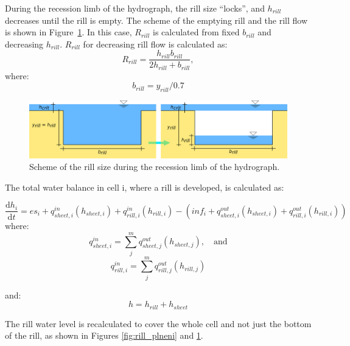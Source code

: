 During the recession limb of the hydrograph, the rill size “locks”, and
$h_{rill}$ decreases until the rill is empty. The scheme of the emptying rill
and the rill flow is shown in Figure~\ref{fig:rill_prazdneni}. In this case,
$R_{rill}$ is calculated from fixed $b_{rill}$ and decreasing $h_{rill}$.
$R_{rill}$ for decreasing rill flow is calculated as:
\begin{equation}
    R_{rill} = \frac{h_{rill}b_{rill}}{2h_{rill}+b_{rill}},
  \label{eq:rrill2}
\end{equation}
where:
\begin{equation}
  b_{rill} = y_{rill}/0.7
  \label{eq:brill2}
\end{equation}

\begin{figure}[t]
    \includegraphics[width=1\linewidth]{./img/rill_schema_prazdneni.png}
    \caption{Scheme of the rill size during the recession limb of the hydrograph.}
    \label{fig:rill_prazdneni}
\end{figure}

The total water balance in cell i, where a rill is developed, is calculated as:

\begin{equation}
    \frac{\mathrm{d}h_i}{\mathrm{d}t} = es_i + q^{in}_{sheet,i}(h_{sheet,i})
    +q^{in}_{rill,i}(h_{rill,i}) - (inf_i + q^{out}_{sheet,i}(h_{sheet,i}) +
    q^{out}_{rill,i}(h_{rill,i}))
\end{equation}
where:
\begin{equation}
    q^{in}_{sheet,i} = \sum_j^m q^{out}_{sheet, j}(h_{sheet,j}),\quad \mathrm{and}
\end{equation}
\begin{equation}
    q^{in}_{rill,i} = \sum_j^m q^{out}_{rill, j}(h_{rill,j})
\end{equation}

and:
\begin{equation}
   h = h_{rill} + h_{sheet}  
\end{equation}

The rill water level is recalculated to cover the whole cell and not just the
bottom of the rill, as shown in Figures \ref{fig:rill_plneni} and
\ref{fig:rill_prazdneni}.

%
%

%

